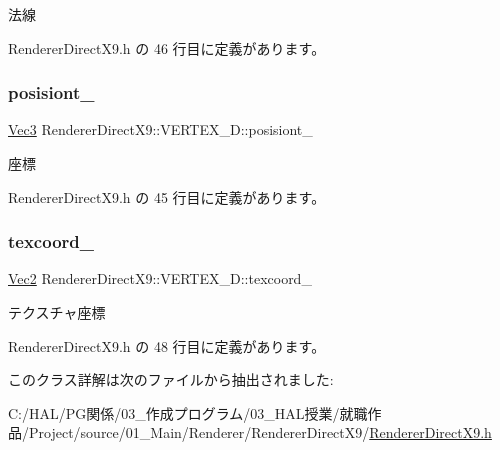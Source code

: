 法線 



 Renderer\+Direct\+X9.\+h の 46 行目に定義があります。

\mbox{\label{class_renderer_direct_x9_1_1_v_e_r_t_e_x__3_d_a15e30709ae06aa5bc8e73054e9f160e9}} 
\subsubsection{\texorpdfstring{posisiont\+\_\+}{posisiont\_}}
{\footnotesize\ttfamily \mbox{\hyperlink{_vector3_d_8h_ab16f59e4393f29a01ec8b9bbbabbe65d}{Vec3}} Renderer\+Direct\+X9\+::\+V\+E\+R\+T\+E\+X\+\_\+D\+::posisiont\+\_\+}



座標 



 Renderer\+Direct\+X9.\+h の 45 行目に定義があります。

\mbox{\label{class_renderer_direct_x9_1_1_v_e_r_t_e_x__3_d_a240251febb14de7b0a6525d3b305f516}} 
\subsubsection{\texorpdfstring{texcoord\+\_\+}{texcoord\_}}
{\footnotesize\ttfamily \mbox{\hyperlink{_vector3_d_8h_a5ef6e95dfc5f9d3820b71772d99bbc25}{Vec2}} Renderer\+Direct\+X9\+::\+V\+E\+R\+T\+E\+X\+\_\+D\+::texcoord\+\_\+}



テクスチャ座標 



 Renderer\+Direct\+X9.\+h の 48 行目に定義があります。



このクラス詳解は次のファイルから抽出されました\+:\begin{DoxyCompactItemize}
\item 
C\+:/\+H\+A\+L/\+P\+G関係/03\+\_\+作成プログラム/03\+\_\+\+H\+A\+L授業/就職作品/\+Project/source/01\+\_\+\+Main/\+Renderer/\+Renderer\+Direct\+X9/\mbox{\hyperlink{_renderer_direct_x9_8h}{Renderer\+Direct\+X9.\+h}}\end{DoxyCompactItemize}
